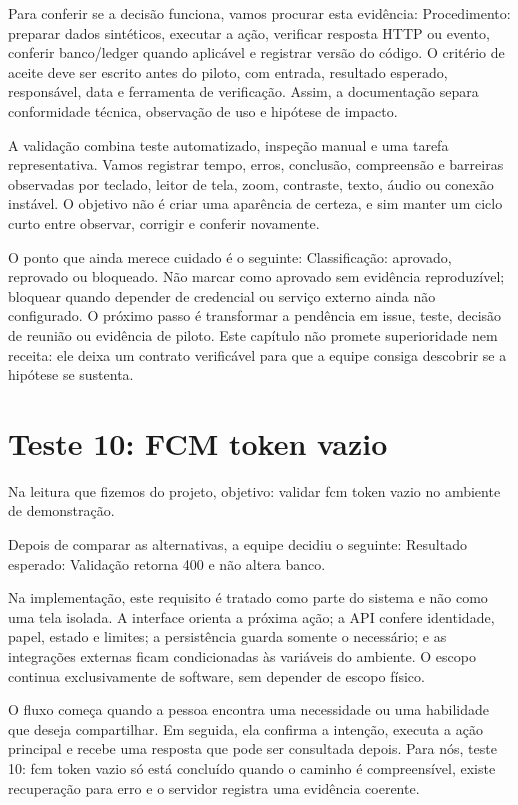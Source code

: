 \documentclass[12pt,oneside,a4paper,article]{abntex2}
\begin{document}
Para conferir se a decisão funciona, vamos procurar esta evidência: Procedimento: preparar dados sintéticos, executar a ação, verificar resposta HTTP ou evento, conferir banco/ledger quando aplicável e registrar versão do código. O critério de aceite deve ser escrito antes do piloto, com entrada, resultado esperado, responsável, data e ferramenta de verificação. Assim, a documentação separa conformidade técnica, observação de uso e hipótese de impacto.

A validação combina teste automatizado, inspeção manual e uma tarefa representativa. Vamos registrar tempo, erros, conclusão, compreensão e barreiras observadas por teclado, leitor de tela, zoom, contraste, texto, áudio ou conexão instável. O objetivo não é criar uma aparência de certeza, e sim manter um ciclo curto entre observar, corrigir e conferir novamente.

O ponto que ainda merece cuidado é o seguinte: Classificação: aprovado, reprovado ou bloqueado. Não marcar como aprovado sem evidência reproduzível; bloquear quando depender de credencial ou serviço externo ainda não configurado. O próximo passo é transformar a pendência em issue, teste, decisão de reunião ou evidência de piloto. Este capítulo não promete superioridade nem receita: ele deixa um contrato verificável para que a equipe consiga descobrir se a hipótese se sustenta.

\section{Teste 10: FCM token vazio}
Na leitura que fizemos do projeto, objetivo: validar fcm token vazio no ambiente de demonstração.

Depois de comparar as alternativas, a equipe decidiu o seguinte: Resultado esperado: Validação retorna 400 e não altera banco.

Na implementação, este requisito é tratado como parte do sistema e não como uma tela isolada. A interface orienta a próxima ação; a API confere identidade, papel, estado e limites; a persistência guarda somente o necessário; e as integrações externas ficam condicionadas às variáveis do ambiente. O escopo continua exclusivamente de software, sem depender de escopo físico.

O fluxo começa quando a pessoa encontra uma necessidade ou uma habilidade que deseja compartilhar. Em seguida, ela confirma a intenção, executa a ação principal e recebe uma resposta que pode ser consultada depois. Para nós, teste 10: fcm token vazio só está concluído quando o caminho é compreensível, existe recuperação para erro e o servidor registra uma evidência coerente.
\end{document}
